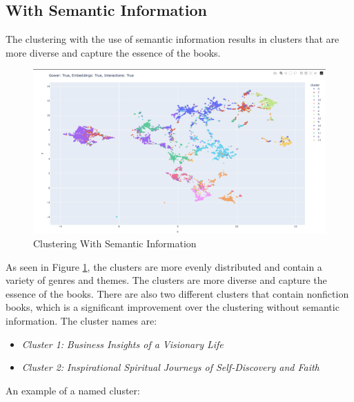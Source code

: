 \documentclass[english]{mvi-report}
\begin{document}
\newpage
\subsection{With Semantic Information}
The clustering with the use of semantic information results in clusters that are more diverse and capture the essence of the books.

\begin{figure}[H]
    \centering
    \includegraphics[width=\linewidth]{img/combined.png}
    \caption{Clustering With Semantic Information}
    \label{fig:with_semantic}
\end{figure}

As seen in Figure \ref{fig:with_semantic}, the clusters are more evenly distributed and contain a variety of genres and themes. The clusters are more diverse and capture the essence of the books. There are also two different clusters that contain nonfiction books, which is a significant improvement over the clustering without semantic information. The cluster names are:

\begin{itemize}
    \item \textit{Cluster 1:} \textit{Business Insights of a Visionary Life}
    \item \textit{Cluster 2:} \textit{Inspirational Spiritual Journeys of Self-Discovery and Faith}
\end{itemize}

An example of a named cluster:
\end{document}
